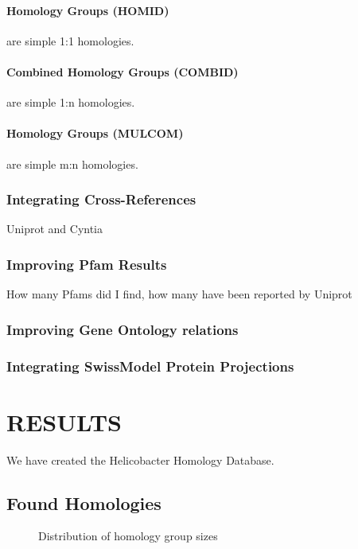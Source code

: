 \documentclass[a4,center,fleqn]{NAR}
\begin{document}
\paragraph{Homology Groups (HOMID)} are simple 1:1 homologies.
\paragraph{Combined Homology Groups (COMBID)} are simple 1:n homologies.
\paragraph{Homology Groups (MULCOM)} are simple m:n homologies.

\subsubsection{Integrating Cross-References}

Uniprot and Cyntia

\subsubsection{Improving Pfam Results}

How many Pfams did I find, how many have been reported by Uniprot

\subsubsection{Improving Gene Ontology relations}

\subsubsection{Integrating SwissModel Protein Projections}



\section{RESULTS}

We have created the Helicobacter Homology Database.

\subsection{Found Homologies}

\begin{figure}
	\caption{Distribution of homology group sizes}
	\label{fig:hom_sizes}
\end{figure}
\end{document}
